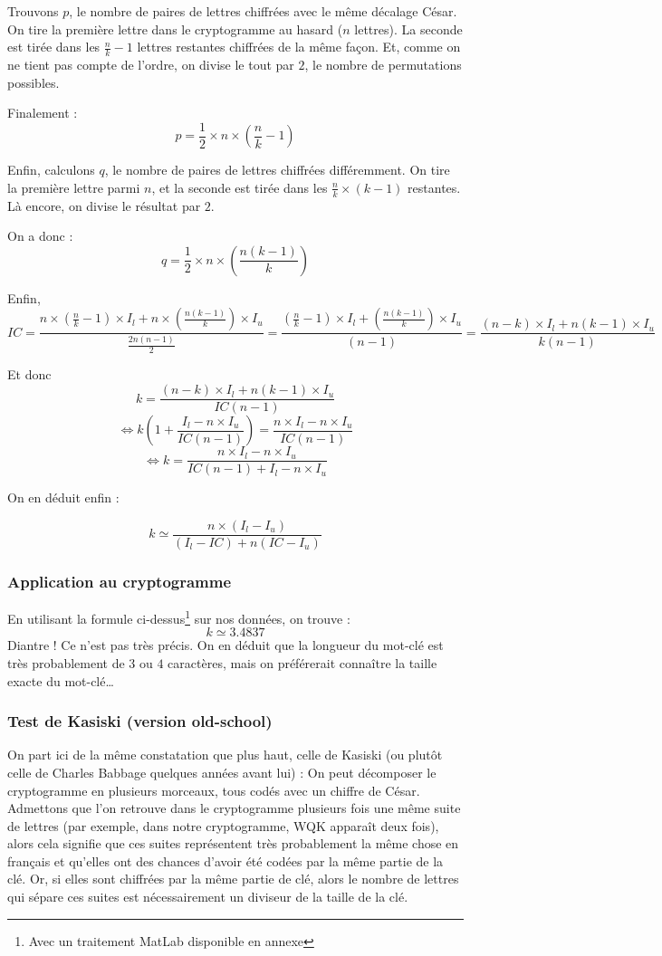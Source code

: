 \documentclass[a4paper, titlepage]{livret}
\begin{document}
Trouvons $p$, le nombre de paires de lettres chiffrées avec le même décalage César.
On tire la première lettre dans le cryptogramme au hasard ($n$ lettres).
La seconde est tirée dans les $\frac{n}{k} - 1$ lettres restantes chiffrées de la même façon.
Et, comme on ne tient pas compte de l'ordre, on divise le tout par $2$, le nombre de permutations possibles.

Finalement :
\[p = \frac{1}{2} \times n \times (\frac{n}{k} - 1)\]

Enfin, calculons $q$, le nombre de paires de lettres chiffrées différemment.
On tire la première lettre parmi $n$, et la seconde est tirée dans les $\frac{n}{k} \times (k-1)$ restantes.
Là encore, on divise le résultat par $2$.

On a donc :
\[q = \frac{1}{2} \times n \times (\frac{n(k-1)}{k})\]

Enfin, 
\[IC = \frac{n \times (\frac{n}{k} - 1) \times I_{l} + n \times (\frac{n(k-1)}{k}) \times I_{u}}{\frac{2n(n-1)}{2}} = \frac{(\frac{n}{k} - 1) \times I_{l} + (\frac{n(k-1)}{k}) \times I_{u}}{(n-1)} = \frac{(n - k) \times I_{l} + n(k-1) \times I_{u}}{k(n-1)}\]

Et donc
\[k = \frac{(n - k) \times I_{l} + n(k-1) \times I_{u}}{IC(n-1)} \]
\[\Leftrightarrow k(1 + \frac{I_{l} - n \times I_{u}}{IC(n-1)}) = \frac{n \times I_{l} - n \times I_{u}}{IC(n-1)}\] 
\[\Leftrightarrow k = \frac{n \times I_{l} - n \times I_{u}}{IC(n-1) + I_{l} - n \times I_{u}}\]


On en déduit enfin :
\begin{center}
  $$\boxed{k \simeq \frac{n \times (I_{l} - I_{u})}{(I_{l} - IC) + n(IC - I_{u})}}$$
\end{center}
\subsubsection{Application au cryptogramme}
En utilisant la formule ci-dessus\footnote{Avec un traitement MatLab disponible en annexe} sur nos données, on trouve :
  $$\boxed{k \simeq 3.4837}$$
Diantre ! Ce n'est pas très précis.
On en déduit que la longueur du mot-clé est très probablement de $3$ ou $4$ caractères, mais on préférerait connaître la taille exacte du mot-clé…

\subsubsection{Test de Kasiski (version old-school)}
On part ici de la même constatation que plus haut, celle de Kasiski (ou plutôt celle de Charles Babbage quelques années avant lui) : 
On peut décomposer le cryptogramme en plusieurs morceaux, tous codés avec un chiffre de César.
Admettons que l'on retrouve dans le cryptogramme plusieurs fois une même suite de lettres (par exemple, dans notre cryptogramme, \og WQK \fg{} apparaît deux fois), alors cela signifie que ces suites représentent très probablement la même chose en français et qu'elles ont des chances d'avoir été codées par la même \og partie \fg{} de la clé.
Or, si elles sont chiffrées par la même \og partie \fg{} de clé, alors le nombre de lettres qui sépare ces suites est nécessairement un diviseur de la taille de la clé.
\end{document}
